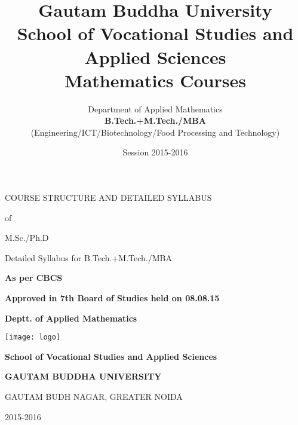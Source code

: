 \documentclass[8pt,b5paper]{extbook}
\begin{document}
\begin{titlepage}

\begin{center}


\vspace{2cm}
{\Large COURSE STRUCTURE AND DETAILED SYLLABUS}

\vspace{1cm}
{\Large {of }}

\vspace{1cm}
{\Large  {M.Sc./Ph.D}}

\vspace{1cm}
{\Large  {Detailed Syllabus for  B.Tech.+M.Tech./MBA}}


\vspace{1cm}
{\huge \bf As per CBCS}

\vfill
{\huge \bf Approved in 7th Board of Studies held on 08.08.15}

\vspace{3cm}
{\huge \bf {Deptt. of Applied Mathematics}}

\vspace{3cm}
\texttt{[image: logo]}

\vspace{1cm}
{\bf \huge {School of Vocational Studies  and Applied Sciences}}

\vspace{1cm}
{\uppercase{ \Large \bf  {GAUTAM BUDDHA UNIVERSITY}}}

\vspace{1cm}
{\large {GAUTAM BUDH NAGAR, GREATER NOIDA}}

\vspace{1cm}
{\huge 2015-2016}
\end{center}
\end{titlepage}

\title{Gautam Buddha University \\ School of Vocational Studies and Applied Sciences\\ Mathematics Courses}
\author{Department of Applied Mathematics \\ \textbf{B.Tech.+M.Tech./MBA} \\{ (Engineering/ICT/Biotechnology/Food Processing and Technology)}}
\date{Session 2015-2016}
\maketitle
\vspace{-1cm}
\tableofcontents
\newpage
\end{document}
